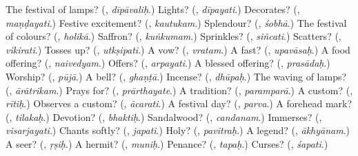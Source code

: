 \begin{tcolorbox}[breakable,colback=teal!4,colframe=teal!35!black,title={Before you move on}]
The festival of lamps? (\textbf{}, \emph{dīpāvaliḥ}.) Lights? (\textbf{}, \emph{dīpayati}.) Decorates? (\textbf{}, \emph{maṇḍayati}.) Festive excitement? (\textbf{}, \emph{kautukam}.) Splendour? (\textbf{}, \emph{śobhā}.) The festival of colours? (\textbf{}, \emph{holikā}.) Saffron? (\textbf{}, \emph{kuṅkumam}.) Sprinkles? (\textbf{}, \emph{siñcati}.) Scatters? (\textbf{}, \emph{vikirati}.) Tosses up? (\textbf{}, \emph{utkṣipati}.) A vow? (\textbf{}, \emph{vratam}.) A fast? (\textbf{}, \emph{upavāsaḥ}.) A food offering? (\textbf{}, \emph{naivedyam}.) Offers? (\textbf{}, \emph{arpayati}.) A blessed offering? (\textbf{}, \emph{prasādaḥ}.) Worship? (\textbf{}, \emph{pūjā}.) A bell? (\textbf{}, \emph{ghaṇṭā}.) Incense? (\textbf{}, \emph{dhūpaḥ}.) The waving of lamps? (\textbf{}, \emph{ārātrikam}.) Prays for? (\textbf{}, \emph{prārthayate}.) A tradition? (\textbf{}, \emph{paramparā}.) A custom? (\textbf{}, \emph{rītiḥ}.) Observes a custom? (\textbf{}, \emph{ācarati}.) A festival day? (\textbf{}, \emph{parva}.) A forehead mark? (\textbf{}, \emph{tilakaḥ}.) Devotion? (\textbf{}, \emph{bhaktiḥ}.) Sandalwood? (\textbf{}, \emph{candanam}.) Immerses? (\textbf{}, \emph{visarjayati}.) Chants softly? (\textbf{}, \emph{japati}.) Holy? (\textbf{}, \emph{pavitraḥ}.) A legend? (\textbf{}, \emph{ākhyānam}.) A seer? (\textbf{}, \emph{ṛṣiḥ}.) A hermit? (\textbf{}, \emph{muniḥ}.) Penance? (\textbf{}, \emph{tapaḥ}.) Curses? (\textbf{}, \emph{śapati}.)
\end{tcolorbox}
